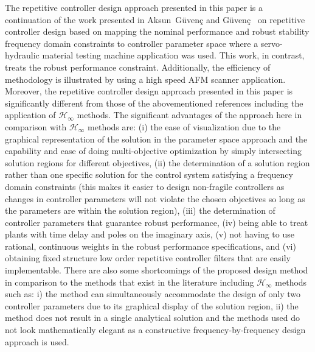 \documentclass[12pt,draftcls,onecolumn]{IEEEtran}
\begin{document}
The repetitive controller design approach presented in this paper is a continuation of the work presented in Aksun~G\"uven\c{c} and
G\"uven\c{c}~\cite{GuG:06} on repetitive controller design based on mapping the nominal performance and robust stability frequency domain constraints to controller parameter space where a servo-hydraulic material testing machine application was used. This work, in contrast, treats the robust performance constraint. Additionally, the efficiency of methodology is illustrated by using a high speed AFM scanner application. Moreover, the repetitive controller design approach presented in this paper is significantly different from those of the abovementioned references including the application of $\mathcal{H}_{\infty}$ methods. The significant advantages of the approach here in comparison with $\mathcal{H}_{\infty}$ methods are: (i) the ease of visualization due to the graphical representation of the solution in the parameter space approach and the capability and ease of doing multi-objective optimization by simply intersecting solution regions for different objectives, (ii) the
determination of a solution region rather than one specific solution for the control system satisfying a frequency domain
constraints (this makes it easier to design non-fragile controllers as changes in controller parameters will not violate the chosen objectives so long as the parameters are within the solution region), (iii) the determination of controller parameters that guarantee robust performance, (iv) being able to treat plants with time delay and poles on the imaginary axis, (v) not having to use rational, continuous weights in the robust performance specifications, and (vi) obtaining fixed structure low order repetitive controller filters that are easily implementable. There
are also some shortcomings of the proposed design method in comparison to the methods that exist in the literature including $\mathcal{H}_{\infty}$ methods such as: i) the method can simultaneously accommodate the design of only two controller parameters due to
its graphical display of the solution region, ii) the method does not result in a single analytical solution and the methods used do
not look mathematically elegant as a constructive frequency-by-frequency design approach is used.
\end{document}
